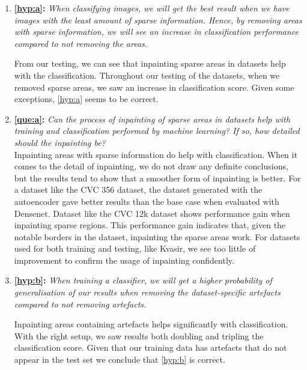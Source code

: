 \begin{enumerate}

\item \textbf{\ref{hyp:a}:} \textit{When classifying images, we will get the best result when we have images with the least amount of sparse information. Hence, by removing areas with sparse information, we will see an increase in classification performance compared to not removing the areas.}

From our testing, we can see that inpainting sparse areas in datasets help with the classification. Throughout our testing of the datasets, when we removed sparse areas, we saw an increase in classification score. Given some exceptions, \ref{hyp:a} seems to be correct.
    


\item \textbf{\ref{que:a}:} \textit{ Can the process of inpainting of sparse areas in datasets help with training and classification performed by machine learning? If so, how detailed should the inpainting be?}\\ 
    
Inpainting areas with sparse information do help with classification. When it comes to the detail of inpainting, we do not draw any definite conclusions, but the results tend to show that a smoother form of inpainting is better.
For a dataset like the CVC 356 dataset, the dataset generated with the autoencoder gave better results than the base case when evaluated with Densenet.
Dataset like the CVC 12k dataset shows performance gain when inpainting sparse regions. This performance gain indicates that, given the notable borders in the dataset, inpainting the sparse areas work.
For datasets used for both training and testing, like Kvasir, we see too little of improvement to confirm the usage of inpainting confidently.
    


\item \textbf{\ref{hyp:b}:} \textit{When training a classifier, we will get a higher probability of generalisation of our results when removing the dataset-specific artefacts compared to not removing artefacts.}
    
Inpainting areas containing artefacts helps significantly with classification. With the right setup, we saw results both doubling and tripling the classification score. Given that our training data has artefacts that do not appear in the test set we conclude that \ref{hyp:b} is correct.



\end{enumerate}
